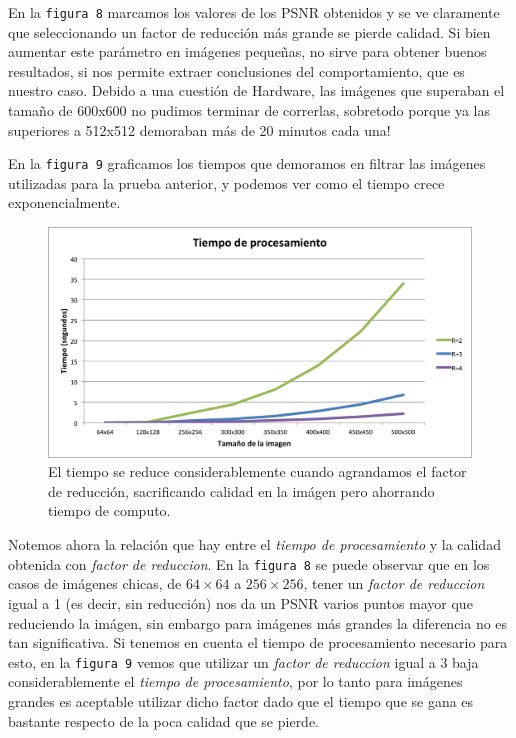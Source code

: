 \documentclass[a4paper]{article}
\begin{document}
En la \texttt{figura 8} marcamos los valores de los PSNR obtenidos y se ve claramente que seleccionando un factor de reducción más grande se pierde calidad. Si bien aumentar este parámetro en imágenes pequeñas, no sirve para obtener buenos resultados, si nos permite extraer conclusiones del comportamiento, que es nuestro caso.
Debido a una cuestión de Hardware, las imágenes que superaban el tamaño de 600x600 no pudimos terminar de correrlas, sobretodo porque ya las superiores a 512x512 demoraban más de 20 minutos cada una!

En la \texttt{figura 9} graficamos los tiempos que demoramos en filtrar las imágenes utilizadas para la prueba anterior, y podemos ver como el tiempo crece exponencialmente.

\begin{figure}[H]
  \centering
  \includegraphics[scale=0.8]{graficos/Tiempo-factor_reduccion.png}
  \caption{ El tiempo se reduce considerablemente cuando agrandamos el factor de reducción, sacrificando calidad en la imágen pero ahorrando tiempo de computo. }
\end{figure}

Notemos ahora la relación que hay entre el \textit{tiempo de procesamiento} y la calidad obtenida con \textit{factor de reduccion}. En la \texttt{figura 8} se puede observar que en los casos de imágenes chicas, de $64 \times 64$ a $256 \times 256$, tener un \textit{factor de reduccion} igual a 1 (es decir, sin reducción) nos da un PSNR varios puntos mayor que reduciendo la imágen, sin embargo para imágenes más grandes la diferencia no es tan significativa. Si tenemos en cuenta el tiempo de procesamiento necesario para esto, en la \texttt{figura 9} vemos que utilizar un \textit{factor de reduccion} igual a 3 baja considerablemente el \textit{tiempo de procesamiento}, por lo tanto para imágenes grandes es aceptable utilizar dicho factor dado que el tiempo que se gana es bastante respecto de la poca calidad que se pierde.
\end{document}
